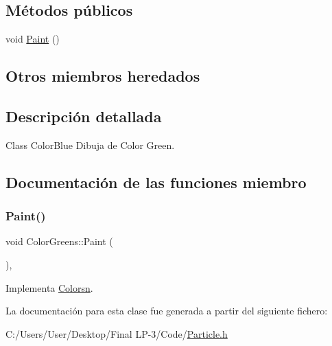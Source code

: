 \subsection*{Métodos públicos}
\begin{DoxyCompactItemize}
\item 
void \mbox{\hyperlink{class_color_greens_a3677ca4f61e8b10f45a92c6e2d57c893}{Paint}} ()
\end{DoxyCompactItemize}
\subsection*{Otros miembros heredados}


\subsection{Descripción detallada}
Class Color\+Blue Dibuja de Color Green. 

\subsection{Documentación de las funciones miembro}
\mbox{\label{class_color_greens_a3677ca4f61e8b10f45a92c6e2d57c893}} 
\subsubsection{\texorpdfstring{Paint()}{Paint()}}
{\footnotesize\ttfamily void Color\+Greens\+::\+Paint (\begin{DoxyParamCaption}{ }\end{DoxyParamCaption})\hspace{0.3cm}{\ttfamily [inline]}, {\ttfamily [virtual]}}



Implementa \mbox{\hyperlink{class_colorsn_ac9c430f99f9e990491ae0ccc49f36d59}{Colorsn}}.



La documentación para esta clase fue generada a partir del siguiente fichero\+:\begin{DoxyCompactItemize}
\item 
C\+:/\+Users/\+User/\+Desktop/\+Final L\+P-\/3/\+Code/\mbox{\hyperlink{_particle_8h}{Particle.\+h}}\end{DoxyCompactItemize}
